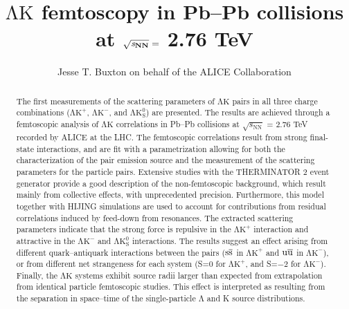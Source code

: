 \documentclass{svproc}
\newcommand{\Lam}{$\mathrm{\Lambda}$\xspace}
\newcommand{\LamK}{$\mathrm{\Lambda}\mathrm{K}$\xspace}
\newcommand{\LamKchP}{$\mathrm{\Lambda}\mathrm{K^{+}}$\xspace}
\newcommand{\LamKchM}{$\mathrm{\Lambda}\mathrm{K^{-}}$\xspace}
\newcommand{\LamKs}{$\mathrm{\Lambda}\mathrm{K^{0}_{S}}$\xspace}
\begin{document}
\mainmatter              %
%
\title{\LamK femtoscopy in Pb--Pb collisions at $\mathbf{\sqrt{{\textit s}_{NN}}} =$ 2.76 TeV}

%
\titlerunning{\LamK femtoscopy in Pb--Pb collisions}  %
%
\author{Jesse T. Buxton on behalf of the ALICE Collaboration}
%
%

%

\maketitle              %

\begin{abstract}
The first measurements of the scattering parameters of \LamK pairs in all three charge combinations (\LamKchP, \LamKchM, and \LamKs) are presented.
The results are achieved through a femtoscopic analysis of \LamK correlations in Pb--Pb collisions at $\sqrt{s_{\mathrm{NN}}}$ = 2.76 TeV recorded by ALICE at the LHC.  
The femtoscopic correlations result from strong final-state interactions, and are fit with a parametrization allowing for both the characterization of the pair emission source and the measurement of the scattering parameters for the particle pairs.
Extensive studies with the THERMINATOR 2 event generator provide a good description of the non-femtoscopic background, which result mainly from collective effects, with unprecedented precision.
Furthermore, this model together with HIJING simulations are used to account for contributions from residual correlations induced by feed-down from resonances.
The extracted scattering parameters indicate that the strong force is repulsive in the \LamKchP interaction and attractive in the \LamKchM and \LamKs interactions.
The results suggest an effect arising from different quark--antiquark interactions between the pairs ($\rm s\overline{s}$ in \LamKchP and $\rm u\overline{u}$ in \LamKchM), or from different net strangeness for each system (S=0 for \LamKchP, and S=$-2$ for \LamKchM).
Finally, the \LamK systems exhibit source radii larger than expected from extrapolation from identical particle femtoscopic studies.
This effect is interpreted as resulting from the separation in space--time of the single-particle \Lam and K source distributions.
\end{abstract}
%
\end{document}
